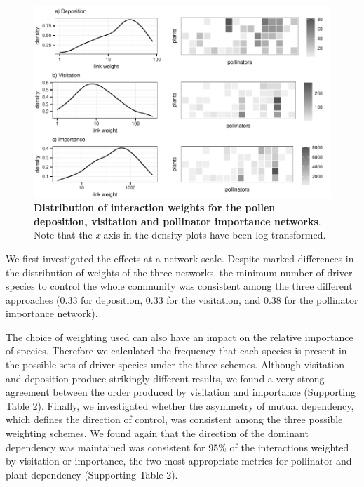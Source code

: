 \documentclass[a4paper]{artikel1}
\begin{document}
\begin{figure}[htbp]
\centering
\includegraphics{supp_info_2_files/figure-latex/fig-visitation-vs-deposition-vs-importance-1.pdf}
\caption{\textbf{Distribution of interaction weights for the pollen
deposition, visitation and pollinator importance networks}. Note that
the \emph{x} axis in the density plots have been log-transformed.}
\end{figure}

We first investigated the effects at a network scale. Despite marked
differences in the distribution of weights of the three networks, the
minimum number of driver species to control the whole community was
consistent among the three different approaches (0.33 for deposition,
0.33 for the visitation, and 0.38 for the pollinator importance
network).

The choice of weighting used can also have an impact on the relative
importance of species. Therefore we calculated the frequency that each
species is present in the possible sets of driver species under the
three schemes. Although visitation and deposition produce strikingly
different results, we found a very strong agreement between the order
produced by visitation and importance (Supporting Table 2). Finally, we
investigated whether the asymmetry of mutual dependency, which defines
the direction of control, was consistent among the three possible
weighting schemes. We found again that the direction of the dominant
dependency was maintained was consistent for 95\% of the interactions
weighted by visitation or importance, the two most appropriate metrics
for pollinator and plant dependency (Supporting Table 2).
\end{document}
